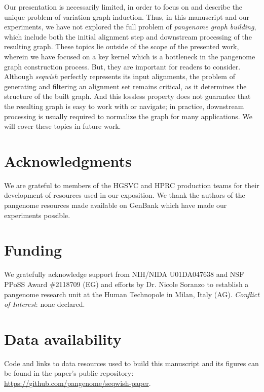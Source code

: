 \documentclass{bioinfo}
\theoremstyle{definition}
\begin{document}
Our presentation is necessarily limited, in order to focus on and describe the unique problem of variation graph induction.
Thus, in this manuscript and our experiments, we have not explored the full problem of \textit{pangenome graph building}, which include both the initial alignment step and downstream processing of the resulting graph.
These topics lie outside of the scope of the presented work, wherein we have focused on a key kernel which is a bottleneck in the pangenome graph construction process.
But, they are important for readers to consider.
Although \textit{seqwish} perfectly represents its input alignments, the problem of generating and filtering an alignment set remains critical, as it determines the structure of the built graph.
And this lossless property does not guarantee that the resulting graph is easy to work with or navigate; in practice, downstream processing is usually required to normalize the graph for many applications.
We will cover these topics in future work.


\section*{Acknowledgments}

We are grateful to members of the HGSVC and HPRC production teams for their development of resources used in our exposition.
We thank the authors of the pangenome resources made available on GenBank which have made our experiments possible.

\section*{Funding}

We gratefully acknowledge support from NIH/NIDA U01DA047638 and NSF PPoSS Award \#2118709 (EG) and efforts by Dr. Nicole Soranzo to establish a pangenome research unit at the Human Technopole in Milan, Italy (AG).
\linebreak
\linebreak
\textit{Conflict of Interest}: none declared.

\section*{Data availability}

Code and links to data resources used to build this manuscript and its figures can be found in the paper's public repository: \url{https://github.com/pangenome/seqwish-paper}.




\end{document}
